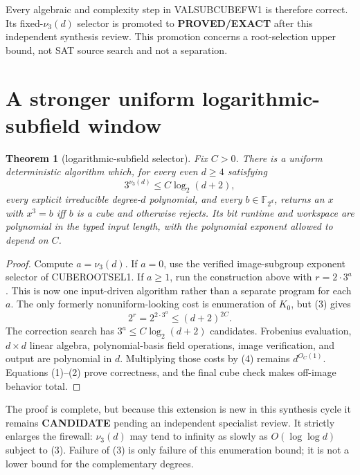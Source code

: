 \documentclass[11pt]{article}
\newtheorem{theorem}{Theorem}
\newcommand{\EXACT}{\textbf{PROVED/EXACT}}
\newcommand{\CAND}{\textbf{CANDIDATE}}
\begin{document}
Every algebraic and complexity step in VALSUBCUBEFW1 is therefore correct.
Its fixed-$\nu_3(d)$ selector is promoted to \EXACT{} after this independent
synthesis review.  This promotion concerns a root-selection upper bound, not
SAT source search and not a separation.

\section{A stronger uniform logarithmic-subfield window}
\begin{theorem}[logarithmic-subfield selector]
Fix $C>0$.  There is a uniform deterministic algorithm which, for every even
$d\ge4$ satisfying
\[
 3^{\nu_3(d)}\le C\log_2(d+2),                          \tag{3}
\]
every explicit irreducible degree-$d$ polynomial, and every
$b\in\mathbb F_{2^d}$, returns an $x$ with $x^3=b$ iff $b$ is a cube and
otherwise rejects.  Its bit runtime and workspace are polynomial in the
typed input length, with the polynomial exponent allowed to depend on $C$.
\end{theorem}
\begin{proof}
Compute $a=\nu_3(d)$.  If $a=0$, use the verified image-subgroup exponent
selector of CUBEROOTSEL1.  If $a\ge1$, run the construction above with
$r=2\cdot3^a$.  This is now one input-driven algorithm rather than a separate
program for each $a$.  The only formerly nonuniform-looking cost is
enumeration of $K_0$, but (3) gives
\[
 2^r=2^{2\cdot3^a}\le (d+2)^{2C}.                      \tag{4}
\]
The correction search has $3^a\le C\log_2(d+2)$ candidates.  Frobenius
evaluation, $d\times d$ linear algebra, polynomial-basis field operations,
image verification, and output are polynomial in $d$.  Multiplying those
costs by (4) remains $d^{O_C(1)}$.  Equations (1)--(2) prove correctness, and
the final cube check makes off-image behavior total.
\end{proof}

The proof is complete, but because this extension is new in this synthesis
cycle it remains \CAND{} pending an independent specialist review.  It
strictly enlarges the firewall: $\nu_3(d)$ may tend to infinity as slowly as
$O(\log\log d)$ subject to (3).  Failure of (3) is only failure of this
enumeration bound; it is not a lower bound for the complementary degrees.
\end{document}
